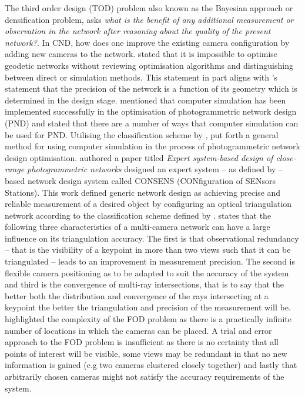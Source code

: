 The third order design (TOD) problem also known as the Bayesian approach or densification problem, asks \textit{what is the benefit of any additional measurement or observation in the network after reasoning about the quality of the present network?}. In CND, how does one improve the existing camera configuration by adding new cameras to the network.
\citet{grafarend1974optimization} stated that it is impossible to optimise geodetic networks without reviewing optimisation algorithms and distinguishing between direct or simulation methods. This statement in part aligns with \citet{fraser1984network}'s statement that the precision of the network is a function of its geometry which is determined in the design stage. 
\citet{fraser1984network} mentioned that computer simulation has been implemented successfully in the optimisation of photogrammetric network design (PND) and stated that there are a number of ways that computer simulation can be used for PND. Utilising the classification scheme by \citet{grafarend1974optimization}, \citet{fraser1984network} put forth a general method for using computer simulation in the process of photogrammetric network design optimisation.
\citet{mason1995expert} authored a paper titled \textit{Expert system-based design of close-range photogrammetric networks} designed an expert system -- as defined by \citet{denning1986towards} -- based network design system called CONSENS (CONfiguration of SENsors Stations). This work defined generic network design as achieving precise and reliable measurement of a desired object by configuring an optical triangulation network according to the classification scheme defined by \citet{grafarend1974optimization}. \citet{mason1995expert} states that the following three characteristics of a multi-camera network can have a large influence on its triangulation accuracy.
The first is that observational redundancy -- that is the visibility of a keypoint in more than two views such that it can be triangulated -- leads to an improvement in measurement precision. 
The second is flexible camera positioning as to be adapted to suit the accuracy of the system and third is the convergence of multi-ray intersections, that is to say that the better both the distribution and convergence of the rays intersecting at a keypoint the better the triangulation and precision of the measurement will be. 
\citet{mason1995expert} highlighted the complexity of the FOD problem as there is a practically infinite number of locations in which the cameras can be placed. A trial and error approach to the FOD problem is insufficient as there is no certainty that all points of interest will be visible, some views may be redundant in that no new information is gained (e.g two cameras clustered closely together) and lastly that arbitrarily chosen cameras might not satisfy the accuracy requirements of the system.
